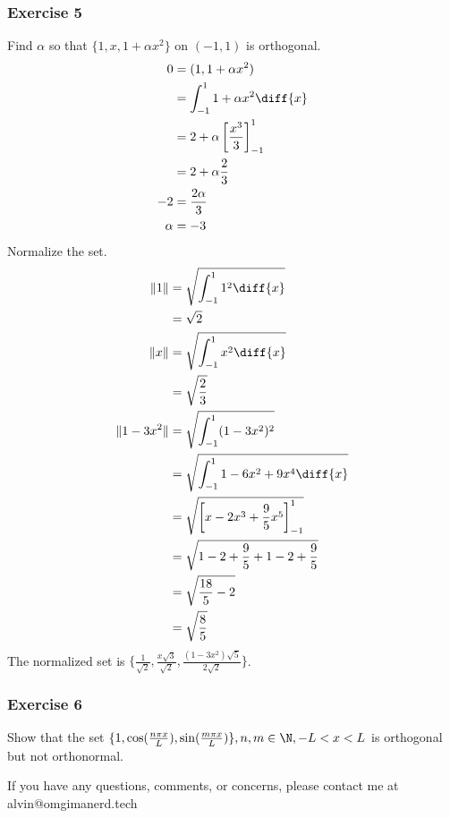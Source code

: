 \documentclass{math}
\begin{document}
\subsubsection*{Exercise 5}
Find \( \alpha \) so that \( \{1,x,1+\alpha x^2\} \) on \( (-1,1) \) is
orthogonal.
\begin{align*}
  0 &= (1,1+\alpha x^2) \\
  &= \int_{-1}^{1}1+\alpha x^2\diff{x} \\
  &= 2+\alpha\left[\frac{x^3}{3}\right]_{-1}^{1} \\
  &= 2+\alpha\frac{2}{3} \\
  -2 &= \frac{2\alpha}{3} \\
  \alpha &= -3
\end{align*}
Normalize the set.
\begin{align*}
  \|1\| &= \sqrt{\int_{-1}^{1}1^2\diff{x}} \\
  &= \sqrt{2} \\
  \|x\| &= \sqrt{\int_{-1}^{1}x^2\diff{x}} \\
  &= \sqrt{\frac{2}{3}} \\
  \|1-3x^2\| &= \sqrt{\int_{-1}^{1}(1-3x^2)^2} \\
  &= \sqrt{\int_{-1}^{1}1-6x^2+9x^4\diff{x}} \\
  &= \sqrt{\left[x-2x^3+\frac{9}{5}x^5\right]_{-1}^{1}} \\
  &= \sqrt{1-2+\frac{9}{5}+1-2+\frac{9}{5}} \\
  &= \sqrt{\frac{18}{5}-2} \\
  &= \sqrt{\frac{8}{5}}
\end{align*}
The normalized set is \( \{\frac{1}{\sqrt{2}},\frac{x\sqrt{3}}{\sqrt{2}},
\frac{(1-3x^2)\sqrt{5}}{2\sqrt{2}}\} \).

\subsubsection*{Exercise 6}
Show that the set \( \{1,\cos(\frac{n\pi x}{L}), \sin(\frac{m\pi x}{L})\},
n,m\in\N, -L<x<L \) is orthogonal but not orthonormal.

\begin{center}
  If you have any questions, comments, or concerns, please contact me at
  alvin@omgimanerd.tech
\end{center}
\end{document}
